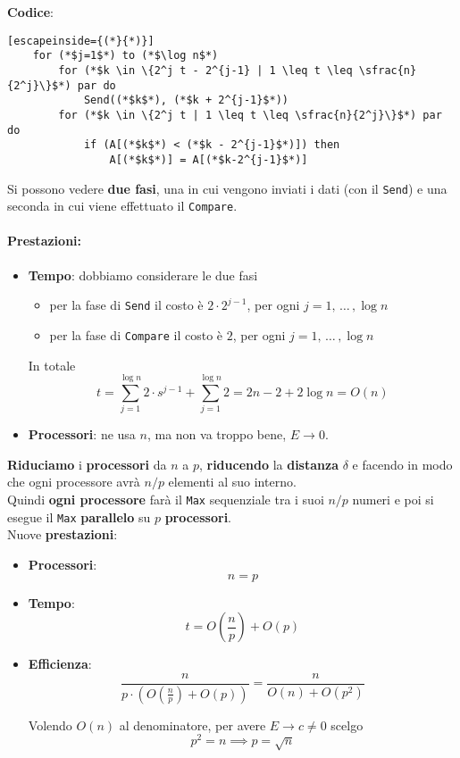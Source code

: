 \textbf{Codice}: 
\begin{lstlisting}[escapeinside={(*}{*)}]
	for (*$j=1$*) to (*$\log n$*)
		for (*$k \in \{2^j t - 2^{j-1} | 1 \leq t \leq \sfrac{n}{2^j}\}$*) par do
			Send((*$k$*), (*$k + 2^{j-1}$*))
		for (*$k \in \{2^j t | 1 \leq t \leq \sfrac{n}{2^j}\}$*) par do
			if (A[(*$k$*) < (*$k - 2^{j-1}$*)]) then 
				A[(*$k$*)] = A[(*$k-2^{j-1}$*)]
\end{lstlisting}

Si possono vedere \textbf{due fasi}, una in cui vengono inviati i dati (con il \texttt{Send}) e una seconda in cui viene effettuato il \texttt{Compare}.\\

\paragraph{Prestazioni:}
\begin{itemize}
	\item \textbf{Tempo}: dobbiamo considerare le due fasi
	\begin{itemize}
		\item per la fase di \texttt{Send} il costo è $2 \cdot 2^{j-1}$, per ogni $j = 1, \, \dots \, , \log n$
		\item per la fase di \texttt{Compare} il costo è $2$, per ogni $j = 1, \, \dots \,, \log n$
	\end{itemize}
	In totale
	$$ t = \sum_{j=1}^{\log n} 2 \cdot s^{j-1} + \sum_{j=1}^{\log n} 2 = 2n-2 + 2 \log n = O(n) $$
	\nn
	
	\item \textbf{Processori}: ne usa $n$, ma non va troppo bene, $E \rightarrow 0$.\\
\end{itemize}

\newpage

\textbf{Riduciamo} i \textbf{processori} da $n$ a $p$, \textbf{riducendo} la \textbf{distanza} $\delta$ e facendo in modo che ogni processore avrà $n/p$ elementi al suo interno. \\

Quindi \textbf{ogni processore} farà il \texttt{Max} sequenziale tra i suoi $n/p$ numeri e poi si esegue il \texttt{Max} \textbf{parallelo} su $p$ \textbf{processori}. \\

Nuove \textbf{prestazioni}: 
\begin{itemize}
	\item \textbf{Processori}: 
	$$ n = p$$
	
	\item \textbf{Tempo}:
	$$ t = O\left(\frac{n}{p}\right) + O(p)$$
	
	\item \textbf{Efficienza}:
	$$ \frac{n}{ p \cdot \left(O\left(\frac{n}{p}\right) + O(p)\right)} = \frac{n}{O(n) + O(p^2)}$$
	
	Volendo $O(n)$ al denominatore, per avere $E \rightarrow c \neq 0$ scelgo 
	$$p^2 = n \implies p = \sqrt{n}$$
	\nn
\end{itemize}

